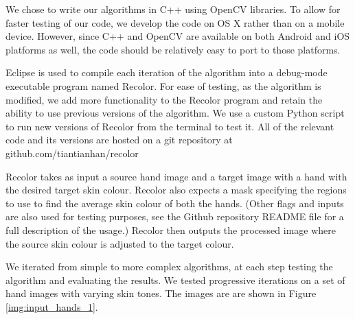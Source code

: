 We chose to write our algorithms in C++ using OpenCV libraries. To allow for faster testing of our code, we develop the code on OS X rather than on a mobile device. However, since C++ and OpenCV are available on both Android and iOS platforms as well, the code should be relatively easy to port to those platforms. 

Eclipse is used to compile each iteration of the algorithm into a debug-mode executable program named Recolor. For ease of testing, as the algorithm is modified, we add more functionality to the Recolor program and retain the ability to use previous versions of the algorithm. We use a custom Python script to run new versions of Recolor from the terminal to test it. All of the relevant code and its versions are hosted on a git repository at github.com/tiantianhan/recolor

Recolor takes as input a source hand image and a target image with a hand with the desired target skin colour. Recolor also expects a mask specifying the regions to use to find the average skin colour of both the hands. (Other flags and inputs are also used for testing purposes, see the Github repository README file for a full description of the usage.) Recolor then outputs the processed image where the source skin colour is adjusted to the target colour.

We iterated from simple to more complex algorithms, at each step testing the algorithm and evaluating the results. We tested progressive iterations on a set of hand images with varying skin tones. The images are are shown in Figure \ref{img:input_hands_1}.


